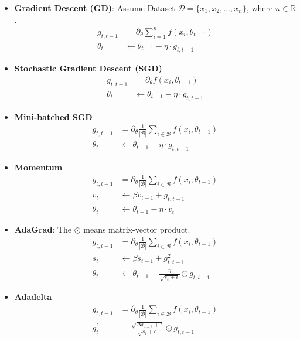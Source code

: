 \documentclass[a4paper]{article}
\begin{document}
\begin{itemize}
	\item \textbf{Gradient Descent (GD)}: Assume Dataset $\mathcal{D} = \{ x_1, x_2, ..., x_n \}$, where $n \in \mathbb{R}$.
	\begin{align}
		g_{t, t-1} &= \partial_{\theta} \sum_{i=1}^{n} f(x_i, \theta_{t-1}) \\
		\theta_{t} &\leftarrow \theta_{t-1} - \eta \cdot g_{t, t-1}
	\end{align}
	\item \textbf{Stochastic Gradient Descent (SGD)}
	\begin{align}
		g_{t, t-1} &= \partial_{\theta} f(x_i, \theta_{t-1}) \\
		\theta_{t} &\leftarrow \theta_{t-1} - \eta \cdot g_{t, t-1}
	\end{align}
	\item \textbf{Mini-batched SGD}
	\begin{align}
		g_{t, t-1} &= \partial_{\theta} \frac{1}{|\mathcal{B}|} \sum_{i \in \mathcal{B}} f(x_i, \theta_{t-1}) \\
		\theta_{t} &\leftarrow \theta_{t-1} - \eta \cdot g_{t, t-1}
	\end{align}
	\item \textbf{Momentum}
	\begin{align}
		g_{t, t-1} &= \partial_{\theta} \frac{1}{|\mathcal{B}|} \sum_{i \in \mathcal{B}} f(x_i, \theta_{t-1}) \\
		v_t &\leftarrow \beta v_{t-1} + g_{t, t-1} \\
		\theta_{t} &\leftarrow \theta_{t-1} - \eta \cdot v_{t}
	\end{align}
	\item \textbf{AdaGrad}: The $\odot$ means matrix-vector product.
	\begin{align}
		g_{t, t-1} &= \partial_{\theta} \frac{1}{|\mathcal{B}|} \sum_{i \in \mathcal{B}} f(x_i, \theta_{t-1}) \\
		s_t &\leftarrow \beta s_{t-1} + g_{t, t-1}^2	 \\
		\theta_{t} &\leftarrow \theta_{t-1} - \frac{\eta}{\sqrt{s_t + \epsilon}} \odot g_{t, t-1}
	\end{align}
	\item \textbf{Adadelta}
	\begin{align}
		g_{t, t-1} &= \partial_{\theta} \frac{1}{|\mathcal{B}|} \sum_{i \in \mathcal{B}} f(x_i, \theta_{t-1}) \\
		g_t^{\prime} &= \frac{\sqrt{\Delta x_{t-1} + \epsilon}}{\sqrt{s_t + \epsilon}} \odot g_{t, t-1} \\

\end{align}
\end{itemize}
\end{document}

